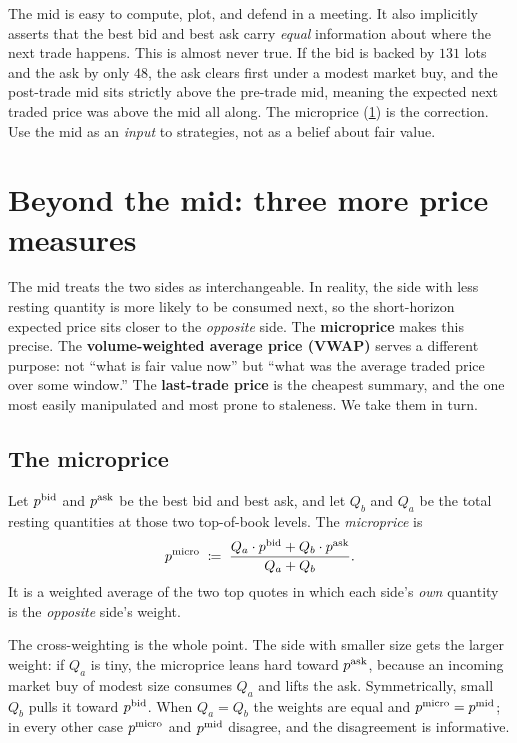 \begin{pitfallbox}
The mid is easy to compute, plot, and defend in a meeting. It also
implicitly asserts that the best bid and best ask carry \emph{equal}
information about where the next trade happens. This is almost never
true. If the bid is backed by $131$ lots and the ask by only $48$,
the ask clears first under a modest market buy, and the post-trade
mid sits strictly above the pre-trade mid, meaning the expected
next traded price was above the mid all along. The microprice
(\cref{sec:beyond_mid}) is the correction. Use the mid as an
\emph{input} to strategies, not as a belief about fair value.
\end{pitfallbox}

\section{Beyond the mid: three more price measures}
\label{sec:beyond_mid}

The mid treats the two sides as interchangeable. In reality, the
side with less resting quantity is more likely to be consumed next,
so the short-horizon expected price sits closer to the
\emph{opposite} side. The \textbf{microprice} makes this precise.
The \textbf{volume-weighted average price (VWAP)} serves a different
purpose: not ``what is fair value now'' but ``what was the average
traded price over some window.'' The \textbf{last-trade price} is
the cheapest summary, and the one most easily manipulated and most
prone to staleness. We take them in turn.

\subsection{The microprice}
\label{subsec:microprice}

\begin{definition}[Microprice]
Let $p^{\mathrm{bid}}$ and $p^{\mathrm{ask}}$ be the best bid and best ask, and let $Q_b$
and $Q_a$ be the total resting quantities at those two top-of-book
levels. The \emph{microprice} is
\[
  p^{\mathrm{micro}} \;\coloneqq\; \frac{Q_a \cdot p^{\mathrm{bid}} + Q_b \cdot p^{\mathrm{ask}}}{Q_a + Q_b}.
\]
It is a weighted average of the two top quotes in which each side's
\emph{own} quantity is the \emph{opposite} side's weight.
\end{definition}

The cross-weighting is the whole point. The side with smaller size
gets the larger weight: if $Q_a$ is tiny, the microprice leans hard
toward $p^{\mathrm{ask}}$, because an incoming market buy of modest size
consumes $Q_a$ and lifts the ask. Symmetrically, small $Q_b$ pulls
it toward $p^{\mathrm{bid}}$. When $Q_a = Q_b$ the weights are equal and
$p^{\mathrm{micro}} = p^{\mathrm{mid}}$; in every other case $p^{\mathrm{micro}}$ and $p^{\mathrm{mid}}$
disagree, and the disagreement is informative.

